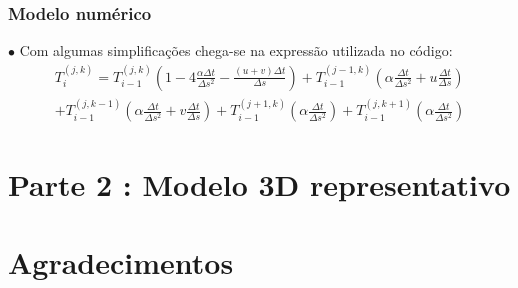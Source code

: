\documentclass[xcolor=dvipsnames,10pt,aspectratio=169]{beamer}
\begin{document}
		\begin{frame} 
	\frametitle{Modelo numérico}
	$\bullet$ Com algumas simplificações chega-se na expressão utilizada no código:
	\begin{equation}
	\begin{split}
	T_i^{(j,k)} = T_{i -1}^{(j,k)} \left( 1 - 4 \frac{\alpha \Delta t}{\Delta s ^2} - \frac{(u + v) \Delta t}{\Delta s}\right) + T_{i -1}^{(j-1,k)} \left( \alpha \frac{\Delta t}{\Delta s^2} + u \frac{\Delta t}{\Delta s} \right)\\
	+ T_{i -1}^{(j,k-1)} \left( \alpha \frac{\Delta t}{\Delta s^2} + v \frac{\Delta t}{\Delta s} \right) +  T_{i-1}^{(j + 1,k)} \left( \alpha \frac{\Delta t}{\Delta s^2}\right) +  T_{i-1}^{(j,k+1)} \left( \alpha \frac{\Delta t}{\Delta s^2}\right)
	\end{split}
	\end{equation}
	
	\end{frame}
	
	
	

	
	\section{Parte 2 : Modelo 3D representativo}
	
	

	
	
	\section{Agradecimentos}
		
		
		
		
		
\end{document}
